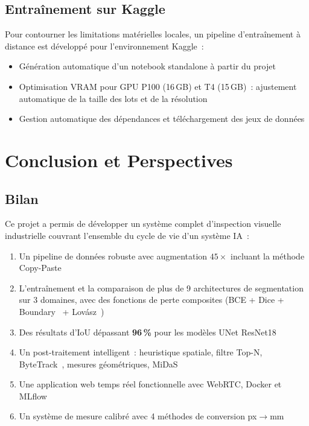 \documentclass[12pt,a4paper]{report}
\begin{document}
\section{Entra\^inement sur Kaggle}

Pour contourner les limitations mat\'erielles locales, un pipeline d'entra\^inement \`a distance est d\'evelopp\'e pour l'environnement Kaggle~:
\begin{itemize}
    \item G\'en\'eration automatique d'un notebook standalone \`a partir du projet
    \item Optimisation VRAM pour GPU P100 (16\,GB) et T4 (15\,GB)~: ajustement automatique de la taille des lots et de la r\'esolution
    \item Gestion automatique des d\'ependances et t\'el\'echargement des jeux de donn\'ees
\end{itemize}


\chapter{Conclusion et Perspectives}

\section{Bilan}

Ce projet a permis de d\'evelopper un syst\`eme complet d'inspection visuelle industrielle couvrant l'ensemble du cycle de vie d'un syst\`eme IA~:

\begin{enumerate}
    \item Un pipeline de donn\'ees robuste avec augmentation $45\times$ incluant la m\'ethode Copy-Paste~\cite{ghiasi2021copypaste}
    \item L'entra\^inement et la comparaison de plus de 9 architectures de segmentation sur 3 domaines, avec des fonctions de perte composites (BCE + Dice + Boundary~\cite{kervadec2019boundary} + Lov\'asz~\cite{berman2018lovasz})
    \item Des r\'esultats d'IoU d\'epassant \textbf{96\,\%} pour les mod\`eles UNet ResNet18~\cite{ronneberger2015unet,he2016resnet}
    \item Un post-traitement intelligent~: heuristique spatiale, filtre Top-N, ByteTrack~\cite{zhang2022bytetrack}, mesures g\'eom\'etriques, MiDaS~\cite{ranftl2020midas}
    \item Une application web temps r\'eel fonctionnelle avec WebRTC, Docker et MLflow
    \item Un syst\`eme de mesure calibr\'e avec 4 m\'ethodes de conversion px$\to$mm
\end{enumerate}
\end{document}
